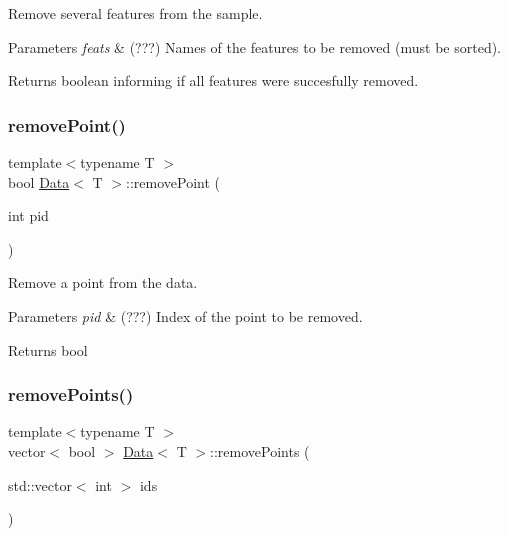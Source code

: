 Remove several features from the sample. 


\begin{DoxyParams}{Parameters}
{\em feats} & (???) Names of the features to be removed (must be sorted). \\
\hline
\end{DoxyParams}
\begin{DoxyReturn}{Returns}
boolean informing if all features were succesfully removed. 
\end{DoxyReturn}
\mbox{\label{class_data_a92ad77892fa46016d890d4ef4954ef2f}} 
\subsubsection{\texorpdfstring{remove\+Point()}{removePoint()}}
{\footnotesize\ttfamily template$<$typename T $>$ \\
bool \mbox{\hyperlink{class_data}{Data}}$<$ T $>$\+::remove\+Point (\begin{DoxyParamCaption}\item[{int}]{pid }\end{DoxyParamCaption})}



Remove a point from the data. 


\begin{DoxyParams}{Parameters}
{\em pid} & (???) Index of the point to be removed. \\
\hline
\end{DoxyParams}
\begin{DoxyReturn}{Returns}
bool 
\end{DoxyReturn}
\mbox{\label{class_data_ae5a3ca86bedc35bef909aac993439827}} 
\subsubsection{\texorpdfstring{remove\+Points()}{removePoints()}}
{\footnotesize\ttfamily template$<$typename T $>$ \\
vector$<$ bool $>$ \mbox{\hyperlink{class_data}{Data}}$<$ T $>$\+::remove\+Points (\begin{DoxyParamCaption}\item[{std\+::vector$<$ int $>$}]{ids }\end{DoxyParamCaption})}



